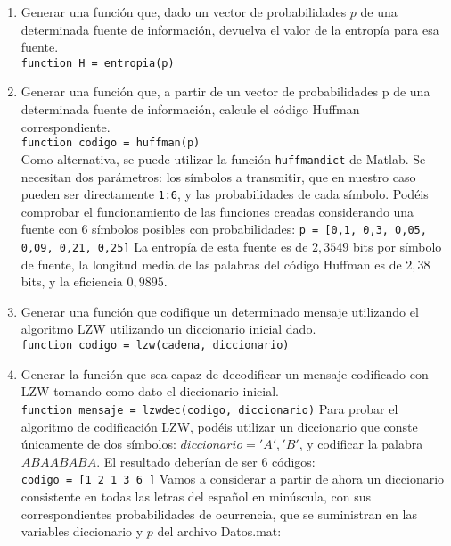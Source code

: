 \documentclass[es,practica]{uah}
\begin{document}
\begin{enumerate}
	\item Generar una función que, dado un vector de probabilidades $p$ de una determinada fuente de información, devuelva el valor de la entropía para esa fuente.\\
		\texttt{function H = entropia(p)}
	\item Generar una función que, a partir de un vector de probabilidades p de una determinada fuente de información, calcule el código Huffman correspondiente.\\
		\texttt{function codigo = huffman(p)}\\
		Como alternativa, se puede utilizar la función \texttt{huffmandict} de Matlab. Se necesitan dos parámetros: los símbolos a transmitir, que en nuestro caso pueden ser directamente \texttt{1:6}, y las probabilidades de cada símbolo.
	Podéis comprobar el funcionamiento de las funciones creadas considerando una fuente con 6 símbolos posibles con probabilidades:
		\texttt{p = [0,1, 0,3, 0,05, 0,09, 0,21, 0,25]}
		La entropía de esta fuente es de $2,3549$ bits por símbolo de fuente, la longitud media de las palabras del código Huffman es de $2,38$ bits, y la eficiencia $0,9895$.
	\item Generar una función que codifique un determinado mensaje utilizando el algoritmo LZW utilizando un diccionario inicial dado.\\
		\texttt{function codigo = lzw(cadena, diccionario)}
	\item Generar la función que sea capaz de decodificar un mensaje codificado con LZW tomando como dato el diccionario inicial.\\
		\texttt{function mensaje = lzwdec(codigo, diccionario)}
		Para probar el algoritmo de codificación LZW, podéis utilizar un diccionario que conste únicamente de dos símbolos: $diccionario = {'A','B'}$, y codificar la palabra $ABAABABA$. El resultado deberían de ser 6 códigos:\\
		\texttt{codigo = [1 2 1 3 6 ]}
	Vamos a considerar a partir de ahora un diccionario consistente en todas las letras del español en minúscula, con sus correspondientes probabilidades de ocurrencia, que se suministran en las variables diccionario y $p$ del archivo Datos.mat:	
	

\end{enumerate}
\end{document}
